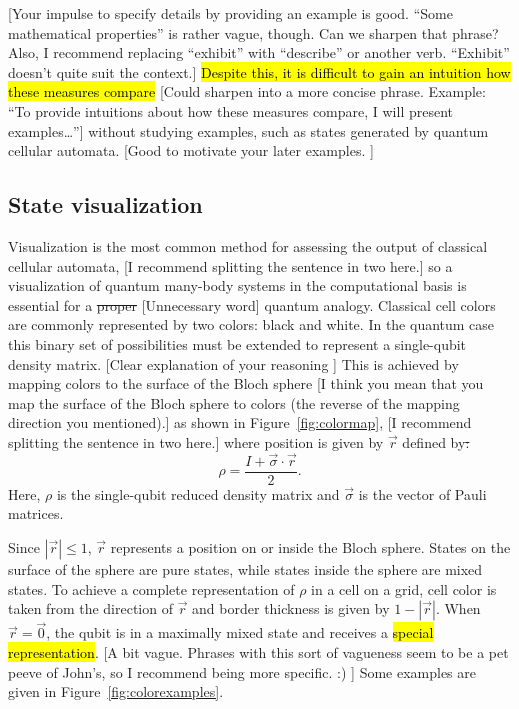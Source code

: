 \documentclass[11pt]{article}
\newcommand{\nicole}[1]{{\color{Green}#1}}
\begin{document}
\begin{multicols}{2}
\nicole{[Your impulse to specify details by providing an example is good. ``Some mathematical properties'' is rather vague, though. Can we sharpen that phrase? 
Also, I recommend replacing ``exhibit'' with ``describe'' or another verb. ``Exhibit'' doesn't quite suit the context.]}
\hl{Despite this, it is difficult to gain an intuition how these measures compare} 
\nicole{[Could sharpen into a more concise phrase. Example: ``To provide intuitions about how these measures compare, I will present examples\ldots'']}
without studying examples, such as states generated by quantum cellular automata.
\nicole{[Good to motivate your later examples. \checkmark]}

\subsection*{State visualization}



Visualization is the most common method for assessing the output of classical cellular automata, 
\nicole{[I recommend splitting the sentence in two here.]}
so a visualization of quantum many-body systems in the computational basis is essential for a \sout{proper} \nicole{[Unnecessary word]} quantum analogy. Classical cell colors are commonly represented by two colors: black and white. In the quantum case this binary set of possibilities must be extended to represent a single-qubit density matrix. 
\nicole{[Clear explanation of your reasoning \checkmark]}
This is achieved by mapping colors to the surface of the Bloch sphere 
\nicole{[I think you mean that you map the surface of the Bloch sphere to colors (the reverse of the mapping direction you mentioned).]}
as shown in Figure~\ref{fig:colormap}, 
\nicole{[I recommend splitting the sentence in two here.]}
where position is given by $\vec{r}$ defined by\sout{:}
$$\rho = \frac{I + \vec \sigma \cdot \vec{r}}{2}.$$
Here\nicole{,} $\rho$ is the single-qubit reduced density matrix and $\vec \sigma$ is the vector of Pauli matrices.

Since $|\vec r| \leq 1$, $\vec r$ represents a position on or inside the Bloch sphere. States on the surface of the sphere are pure states\nicole{,} while states inside the sphere are mixed states. To achieve a complete representation of $\rho$ in a cell on a grid, 
cell color is taken from the direction of $\vec r$ and border thickness is given by $1- |\vec r|$. When $\vec r = \vec 0$\nicole{,} the qubit is in a maximally mixed state and receives a \hl{special representation}. \nicole{[A bit vague. Phrases with this sort of vagueness seem to be a pet peeve of John's, so I recommend being more specific. :) ]} Some examples are given in Figure~\ref{fig:colorexamples}.




\end{multicols}
\end{document}
